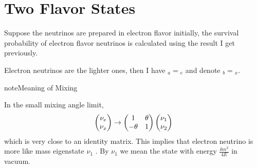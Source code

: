 \documentclass[letterpaper,12pt,english]{sphinxmanual}
\begin{document}
\section{Two Flavor States}
\label{vacuum:two-flavor-states}
Suppose the neutrinos are prepared in electron flavor initially, the survival probability of electron flavor neutrinos is calculated using the result I get previously.

Electron neutrinos are the lighter ones, then I have \({}_a = {}_e\) and denote \({}_b={}_x\).

\begin{notice}{note}{Meaning of Mixing}

In the small mixing angle limit,
\begin{gather}
\begin{split}\begin{pmatrix}\nu_e \\ \nu_x\end{pmatrix} \to \begin{pmatrix}  1 & \theta \\ -\theta  & 1 \end{pmatrix}   \begin{pmatrix}\nu_1 \\ \nu_2\end{pmatrix}\end{split}\notag
\end{gather}
which is very close to an identity matrix. This implies that electron neutrino is more like mass eigenstate  \(\nu_1\) . By \(\nu_1\) we mean the state with energy  \(\frac{ \delta m^2 }{4E}\) in vacuum.
\end{notice}
\end{document}
